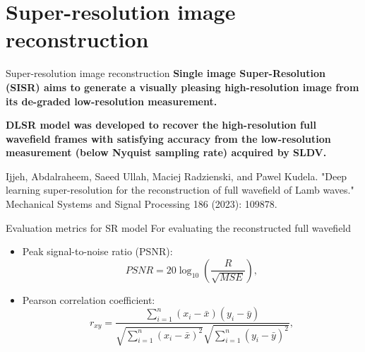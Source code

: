 \documentclass[10pt,aspectratio=169,dvipsnames]{beamer} %
\begin{document}
		\section{Super-resolution image reconstruction}
		\setcounter{subfigure}{0}
		\begin{frame}{Super-resolution image reconstruction}
			\textbf{Single image Super-Resolution (SISR) aims to generate a visually pleasing high-resolution image from its de-graded low-resolution measurement.}
			\begin{figure}
				\centering
				\qquad
			\end{figure}
			\textbf{DLSR model was developed to recover the high-resolution full wavefield frames with satisfying accuracy from the low-resolution measurement (below Nyquist sampling rate) acquired by SLDV.}
			\tiny

			\noindent Ijjeh, Abdalraheem, Saeed Ullah, Maciej Radzienski, and Pawel Kudela. \alert{"Deep learning super-resolution for the reconstruction of full wavefield of Lamb waves."} Mechanical Systems and Signal Processing 186 (2023): 109878.
		\end{frame}
		
		\begin{frame}{Evaluation metrics for SR model}
			For evaluating the reconstructed full wavefield
			\begin{itemize}
				\item Peak signal-to-noise ratio (PSNR):
				\begin{equation*}
					PSNR=20\log_{10}\left(\frac{R}{\sqrt{MSE}}\right),
					\label{PSNR}
				\end{equation*}
				\item Pearson correlation coefficient:
				\begin{equation*}
					r_{xy} = \frac{\sum_{i=1}^{n}(x_i - \bar{x})(y_i-\bar{y})}{\sqrt{\sum_{i=1}^{n}(x_i - \bar{x})^2}\sqrt{\sum_{i=1}^{n}(y_i - \bar{y})^2}},
					\label{Pearson}
				\end{equation*}
			\end{itemize}
		\end{frame}
		
\end{document}

